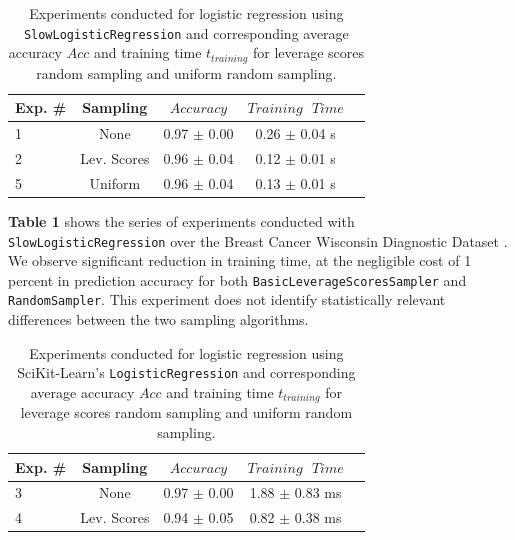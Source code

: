 \documentclass{article}
\theoremstyle{plain}
\theoremstyle{definition}
\theoremstyle{remark}
\begin{document}
\begin{table}[t]
	\caption{Experiments conducted for logistic regression using \texttt{SlowLogisticRegression} and corresponding average accuracy $Acc$ and training time $t_{training}$ for leverage scores random sampling and uniform random sampling.}
	\label{t1}
	\vskip 0.15in
	\begin{center}
		\begin{small}
			\begin{sc}
				\begin{tabular}{lcccr}
					\toprule
					Exp. \# & Sampling & $Accuracy$ & $Training \text{ } Time$\\
					\midrule
					1 & None & 0.97 $\pm$ 0.00 & 0.26 $\pm$ 0.04 s \\
					2 & Lev. Scores & 0.96 $\pm$ 0.04 & 0.12 $\pm$ 0.01 s \\
					5 & Uniform & 0.96 $\pm$ 0.04 & 0.13 $\pm$ 0.01 s \\
					\bottomrule
				\end{tabular}
			\end{sc}
		\end{small}
	\end{center}
	\vskip -0.1in
\end{table}

\textbf{Table 1} shows the series of experiments conducted with \texttt{SlowLogisticRegression} over the Breast Cancer Wisconsin Diagnostic Dataset \cite{breastcancer}. We observe significant reduction in training time, at the negligible cost of 1 percent in prediction accuracy for both \texttt{BasicLeverageScoresSampler} and \texttt{RandomSampler}. This experiment does not identify statistically relevant differences between the two sampling algorithms.

\begin{table}[t]
	\caption{Experiments conducted for logistic regression using SciKit-Learn's \texttt{LogisticRegression} and corresponding average accuracy $Acc$ and training time $t_{training}$ for leverage scores random sampling and uniform random sampling.}
	\label{t2}
	\vskip 0.15in
	\begin{center}
		\begin{small}
			\begin{sc}
				\begin{tabular}{lcccr}
					\toprule
					Exp. \# & Sampling & $Accuracy$ & $Training \text{ } Time$\\
					\midrule
					3 & None & 0.97 $\pm$ 0.00 & 1.88 $\pm$ 0.83 ms \\
					4 & Lev. Scores & 0.94 $\pm$ 0.05 & 0.82 $\pm$ 0.38 ms \\
					\bottomrule
				\end{tabular}
			\end{sc}
		\end{small}
	\end{center}
	\vskip -0.1in
\end{table}
\end{document}
